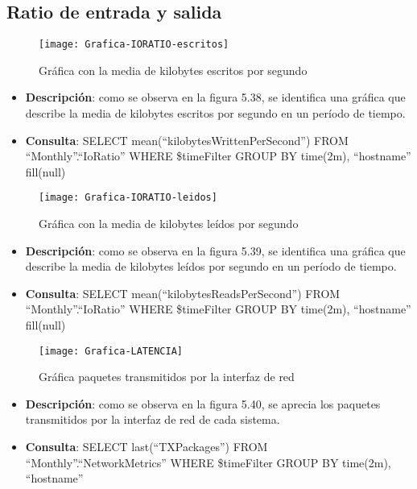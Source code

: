\documentclass[ spanish, a4paper, 12pt, oneside]{report}
\begin{document}
\subsection{Ratio de entrada y salida}

\begin{figure}[!h]
   \centering
   \texttt{[image: Grafica-IORATIO-escritos]}\\
      \caption{\label{fig: Gráfica con la media de kilobytes escritos por segundo} Gráfica con la media de kilobytes escritos por segundo}
\end{figure}

\begin{itemize}
   \item \textbf{Descripción}: como se observa en la figura 5.38, se identifica una gráfica que describe la media de kilobytes escritos por segundo en un período de tiempo.
   \item \textbf{Consulta}: SELECT mean(``kilobytesWrittenPerSecond'') FROM ``Monthly''.``IoRatio'' WHERE \$timeFilter GROUP BY time(2m), ``hostname'' fill(null)
\end{itemize}

\begin{figure}[!h]
   \centering
   \texttt{[image: Grafica-IORATIO-leidos]}\\
      \caption{\label{fig: Gráfica con la media de kilobytes leídos por segundo} Gráfica con la media de kilobytes leídos por segundo}
\end{figure}

\begin{itemize}
   \item \textbf{Descripción}: como se observa en la figura 5.39, se identifica una gráfica que describe la media de kilobytes leídos por segundo en un período de tiempo.
   \item \textbf{Consulta}: SELECT mean(``kilobytesReadsPerSecond'') FROM ``Monthly''.``IoRatio'' WHERE \$timeFilter GROUP BY time(2m), ``hostname'' fill(null)
\end{itemize}


\begin{figure}[!h]
   \centering
   \texttt{[image: Grafica-LATENCIA]}\\
      \caption{\label{fig: Gráfica paquetes transmitidos por la interfaz de red} Gráfica paquetes transmitidos por la interfaz de red}
\end{figure}

\begin{itemize}
   \item \textbf{Descripción}: como se observa en la figura 5.40, se aprecia los paquetes transmitidos por la interfaz de red de cada sistema.
   \item \textbf{Consulta}: SELECT last(``TXPackages'') FROM ``Monthly''.``NetworkMetrics'' WHERE \$timeFilter GROUP BY time(2m), ``hostname''
\end{itemize}
\end{document}
